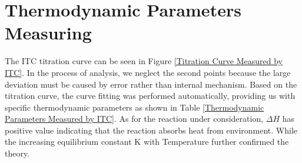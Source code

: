 \documentclass{report}
\begin{document}
\section{Thermodynamic Parameters Measuring}
The ITC  titration curve can be seen in Figure \ref{Titration Curve Measured by ITC}.
In the process of analysis, we neglect the second points because the large deviation must be caused by error rather than internal mechanism.
Based on the titration curve, the curve fitting was performed automatically, providing us with specific thermodynamic parameters as shown in Table \ref{Thermodynamic Parameters Measured by ITC}.
As for the reaction under consideration, $\Delta H$ has positive value indicating that the reaction absorbs heat from environment.
While the increasing equilibrium constant K with Temperature further confirmed the theory.
\end{document}

